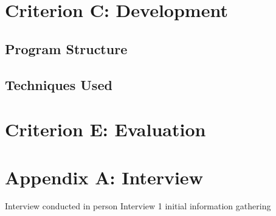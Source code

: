 \documentclass{article}
\begin{document}
	\section{Criterion C: Development}
		\subsection{Program Structure}
		\subsection{Techniques Used}
		\newpage
	\section{Criterion E: Evaluation}
		\newpage
	\section{Appendix A: Interview}
		Interview conducted in person
		Interview 1 initial information gathering
\end{document}
